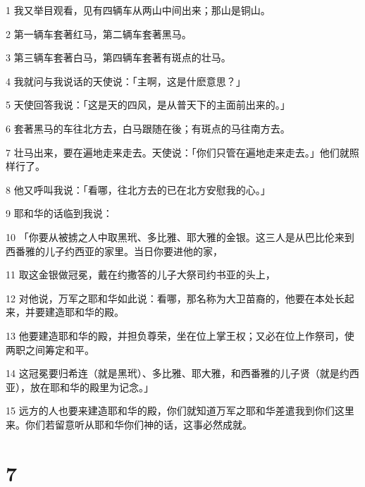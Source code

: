 \par 1 我又举目观看，见有四辆车从两山中间出来；那山是铜山。
\par 2 第一辆车套著红马，第二辆车套著黑马。
\par 3 第三辆车套著白马，第四辆车套著有斑点的壮马。
\par 4 我就问与我说话的天使说：「主啊，这是什麽意思？」
\par 5 天使回答我说：「这是天的四风，是从普天下的主面前出来的。」
\par 6 套著黑马的车往北方去，白马跟随在後；有斑点的马往南方去。
\par 7 壮马出来，要在遍地走来走去。天使说：「你们只管在遍地走来走去。」他们就照样行了。
\par 8 他又呼叫我说：「看哪，往北方去的已在北方安慰我的心。」
\par 9 耶和华的话临到我说：
\par 10 「你要从被掳之人中取黑玳、多比雅、耶大雅的金银。这三人是从巴比伦来到西番雅的儿子约西亚的家里。当日你要进他的家，
\par 11 取这金银做冠冕，戴在约撒答的儿子大祭司约书亚的头上，
\par 12 对他说，万军之耶和华如此说：看哪，那名称为大卫苗裔的，他要在本处长起来，并要建造耶和华的殿。
\par 13 他要建造耶和华的殿，并担负尊荣，坐在位上掌王权；又必在位上作祭司，使两职之间筹定和平。
\par 14 这冠冕要归希连（就是黑玳）、多比雅、耶大雅，和西番雅的儿子贤（就是约西亚），放在耶和华的殿里为记念。」
\par 15 远方的人也要来建造耶和华的殿，你们就知道万军之耶和华差遣我到你们这里来。你们若留意听从耶和华你们神的话，这事必然成就。

\chapter{7}

